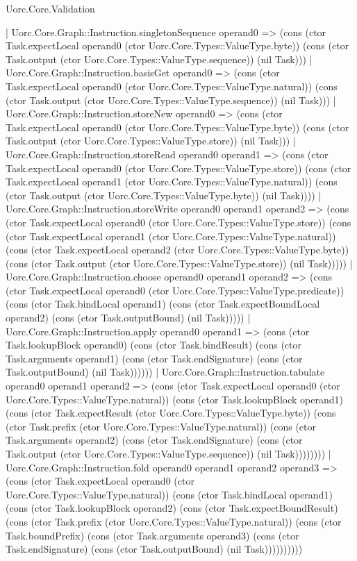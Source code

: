 \begin{lexlean}{Uorc.Core.Validation}
\begin{semanticmodule}
{    | Uorc.Core.Graph::Instruction.singletonSequence operand0 => (cons (ctor Task.expectLocal operand0 (ctor Uorc.Core.Types::ValueType.byte)) (cons (ctor Task.output (ctor Uorc.Core.Types::ValueType.sequence)) (nil Task)))
    | Uorc.Core.Graph::Instruction.basisGet operand0 => (cons (ctor Task.expectLocal operand0 (ctor Uorc.Core.Types::ValueType.natural)) (cons (ctor Task.output (ctor Uorc.Core.Types::ValueType.sequence)) (nil Task)))
    | Uorc.Core.Graph::Instruction.storeNew operand0 => (cons (ctor Task.expectLocal operand0 (ctor Uorc.Core.Types::ValueType.byte)) (cons (ctor Task.output (ctor Uorc.Core.Types::ValueType.store)) (nil Task)))
    | Uorc.Core.Graph::Instruction.storeRead operand0 operand1 => (cons (ctor Task.expectLocal operand0 (ctor Uorc.Core.Types::ValueType.store)) (cons (ctor Task.expectLocal operand1 (ctor Uorc.Core.Types::ValueType.natural)) (cons (ctor Task.output (ctor Uorc.Core.Types::ValueType.byte)) (nil Task))))
    | Uorc.Core.Graph::Instruction.storeWrite operand0 operand1 operand2 => (cons (ctor Task.expectLocal operand0 (ctor Uorc.Core.Types::ValueType.store)) (cons (ctor Task.expectLocal operand1 (ctor Uorc.Core.Types::ValueType.natural)) (cons (ctor Task.expectLocal operand2 (ctor Uorc.Core.Types::ValueType.byte)) (cons (ctor Task.output (ctor Uorc.Core.Types::ValueType.store)) (nil Task)))))
    | Uorc.Core.Graph::Instruction.choose operand0 operand1 operand2 => (cons (ctor Task.expectLocal operand0 (ctor Uorc.Core.Types::ValueType.predicate)) (cons (ctor Task.bindLocal operand1) (cons (ctor Task.expectBoundLocal operand2) (cons (ctor Task.outputBound) (nil Task)))))
    | Uorc.Core.Graph::Instruction.apply operand0 operand1 => (cons (ctor Task.lookupBlock operand0) (cons (ctor Task.bindResult) (cons (ctor Task.arguments operand1) (cons (ctor Task.endSignature) (cons (ctor Task.outputBound) (nil Task))))))
    | Uorc.Core.Graph::Instruction.tabulate operand0 operand1 operand2 => (cons (ctor Task.expectLocal operand0 (ctor Uorc.Core.Types::ValueType.natural)) (cons (ctor Task.lookupBlock operand1) (cons (ctor Task.expectResult (ctor Uorc.Core.Types::ValueType.byte)) (cons (ctor Task.prefix (ctor Uorc.Core.Types::ValueType.natural)) (cons (ctor Task.arguments operand2) (cons (ctor Task.endSignature) (cons (ctor Task.output (ctor Uorc.Core.Types::ValueType.sequence)) (nil Task))))))))
    | Uorc.Core.Graph::Instruction.fold operand0 operand1 operand2 operand3 => (cons (ctor Task.expectLocal operand0 (ctor Uorc.Core.Types::ValueType.natural)) (cons (ctor Task.bindLocal operand1) (cons (ctor Task.lookupBlock operand2) (cons (ctor Task.expectBoundResult) (cons (ctor Task.prefix (ctor Uorc.Core.Types::ValueType.natural)) (cons (ctor Task.boundPrefix) (cons (ctor Task.arguments operand3) (cons (ctor Task.endSignature) (cons (ctor Task.outputBound) (nil Task))))))))))
}
\end{semanticmodule}
\end{lexlean}
